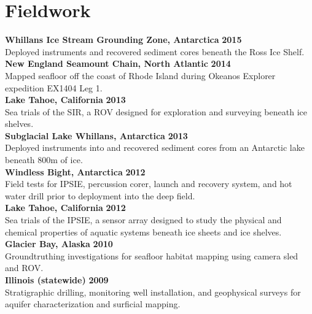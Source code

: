 \section{Fieldwork} 
\textbf{Whillans Ice Stream Grounding Zone, Antarctica} \hfill \textbf{2015}\\
Deployed instruments and recovered sediment cores beneath the Ross Ice Shelf. \\
\vspace{2mm}
\textbf{New England Seamount Chain, North Atlantic} \hfill \textbf{2014}\\
Mapped seafloor off the coast of Rhode Island during Okeanos Explorer expedition EX1404 Leg 1. \\
\vspace{2mm}
\textbf{Lake Tahoe, California} \hfill \textbf{2013}\\
Sea trials of the SIR, a ROV designed for exploration and surveying beneath ice shelves. \\
\vspace{2mm}
\textbf{Subglacial Lake Whillans, Antarctica} \hfill \textbf{2013}\\
Deployed instruments into and recovered sediment cores from an Antarctic lake beneath 800m of ice.\\
\vspace{2mm}
\textbf{Windless Bight, Antarctica} \hfill \textbf{2012}\\
Field tests for IPSIE, percussion corer, launch and recovery system, and hot water drill prior to deployment into the deep field.\\
\vspace{2mm}
\textbf{Lake Tahoe, California} \hfill \textbf{2012}\\
Sea trials of the IPSIE, a sensor array designed to study the physical and chemical properties of aquatic systems beneath ice sheets and ice shelves. \\
\vspace{2mm}
\textbf{Glacier Bay, Alaska} \hfill \textbf{2010}\\
Groundtruthing investigations for seafloor habitat mapping using camera sled and ROV.\\
\vspace{2mm}
\textbf{Illinois (statewide)} \hfill \textbf{2009}\\
Stratigraphic drilling, monitoring well installation, and geophysical surveys for aquifer characterization and surficial mapping. \\

